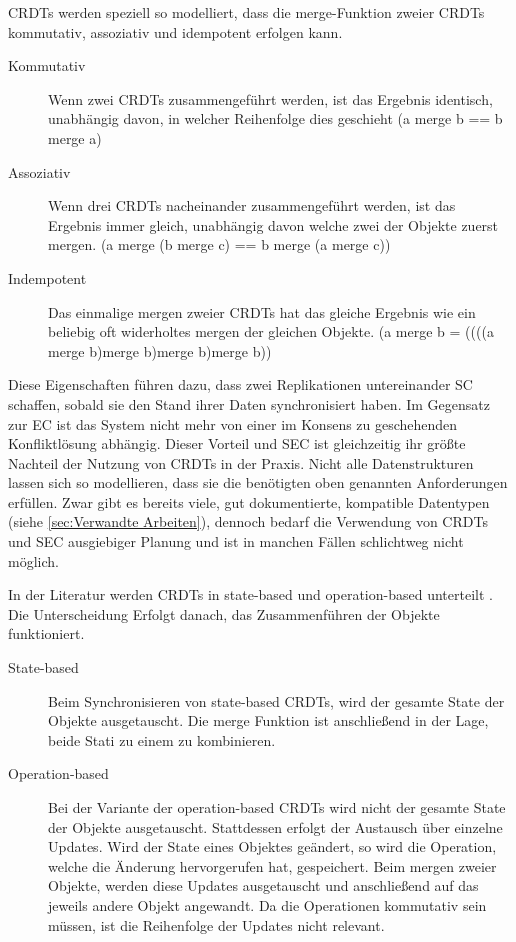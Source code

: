 \documentclass[a4paper, 12pt]{scrreprt}
\begin{document}

CRDTs werden speziell so modelliert, dass die merge-Funktion zweier CRDTs kommutativ, assoziativ und idempotent erfolgen kann.

\begin{description}
	\item[Kommutativ] Wenn zwei CRDTs zusammengeführt werden, ist das Ergebnis identisch, unabhängig davon, in welcher Reihenfolge dies geschieht (a merge b == b merge a)
	\item[Assoziativ] Wenn drei CRDTs nacheinander zusammengeführt werden, ist das Ergebnis immer gleich, unabhängig davon welche zwei der Objekte zuerst mergen. (a merge (b merge c) == b merge (a merge c))
	\item[Indempotent] Das einmalige mergen zweier CRDTs hat das gleiche Ergebnis wie ein beliebig oft widerholtes mergen der gleichen Objekte. (a merge b = ((((a merge b)merge b)merge b)merge b))
\end{description}

Diese Eigenschaften führen dazu, dass zwei Replikationen untereinander \ac{SC} schaffen, sobald sie den Stand ihrer Daten synchronisiert haben. Im Gegensatz zur \ac{EC} ist das System nicht mehr von einer im Konsens zu geschehenden Konfliktlösung abhängig. Dieser Vorteil und \ac{SEC} ist gleichzeitig ihr größte Nachteil der Nutzung von CRDTs in der Praxis. Nicht alle Datenstrukturen lassen sich so modellieren, dass sie die benötigten oben genannten Anforderungen erfüllen. Zwar gibt es bereits viele, gut dokumentierte, kompatible Datentypen (siehe \ref{sec:Verwandte Arbeiten}), dennoch bedarf die Verwendung von CRDTs und \ac{SEC} ausgiebiger Planung und ist in manchen Fällen schlichtweg nicht möglich. 

In der Literatur werden CRDTs in state-based und operation-based unterteilt \autocite[S. 10]{ArticleOptimisticReplication}. Die Unterscheidung Erfolgt danach, das Zusammenführen der Objekte funktioniert.

\begin{description}
	\item[State-based]
	Beim Synchronisieren von state-based CRDTs, wird der gesamte State der Objekte ausgetauscht.
	Die merge Funktion ist anschließend in der Lage, beide Stati zu einem zu kombinieren. 
	
	\item[Operation-based]
	Bei der Variante der operation-based CRDTs wird nicht der gesamte State der Objekte ausgetauscht. Stattdessen erfolgt der Austausch über einzelne Updates. Wird der State eines Objektes geändert, so wird die Operation, welche die Änderung hervorgerufen hat, gespeichert. Beim mergen zweier Objekte, werden diese Updates ausgetauscht und anschließend auf das jeweils andere Objekt angewandt. Da die Operationen kommutativ sein müssen,
	ist die Reihenfolge der Updates nicht relevant. 
\end{description} 
\end{document}
